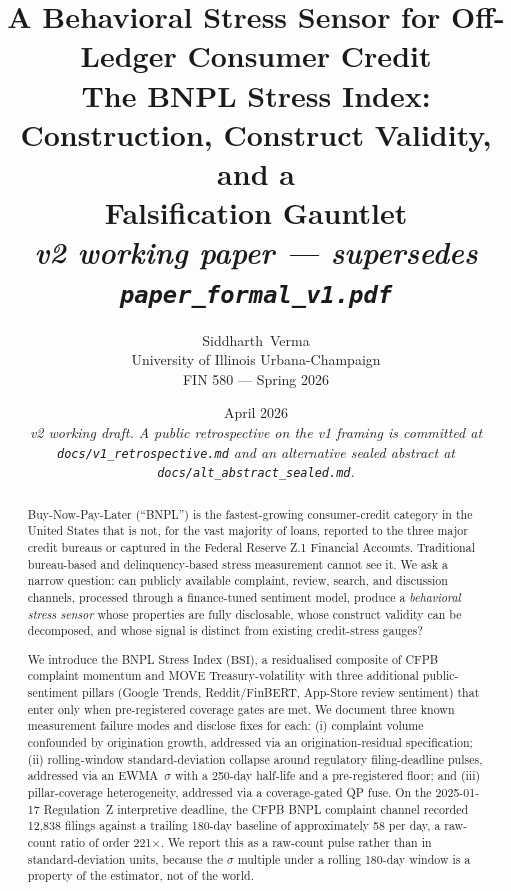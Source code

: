 \documentclass[11pt,letterpaper]{article}
\title{\vspace{-2em}
\Huge\bfseries A Behavioral Stress Sensor for Off-Ledger Consumer Credit\\[0.2em]
\Large The BNPL Stress Index: Construction, Construct Validity, and a\\
Falsification Gauntlet\\[0.3em]
\normalsize\mdseries\itshape v2 working paper --- supersedes \texttt{paper\_formal\_v1.pdf}}
\author{
Siddharth~Verma \\[0.3em]
\small University of Illinois Urbana-Champaign \\
\small FIN 580 --- Spring 2026}
\date{April 2026\\
\small\textit{v2 working draft. A public retrospective on the v1
framing is committed at \texttt{docs/v1\_retrospective.md} and an
alternative sealed abstract at \texttt{docs/alt\_abstract\_sealed.md}.}}
\newcommand{\bsi}{\text{BSI}}
\begin{document}
\maketitle
\thispagestyle{empty}

\begin{abstract}
\noindent
Buy-Now-Pay-Later (``BNPL'') is the fastest-growing consumer-credit
category in the United States that is not, for the vast majority of
loans, reported to the three major credit bureaus or captured in the
Federal Reserve Z.1 Financial Accounts. Traditional bureau-based and
delinquency-based stress measurement cannot see it. We ask a narrow
question: can publicly available complaint, review, search, and
discussion channels, processed through a finance-tuned sentiment
model, produce a \emph{behavioral stress sensor} whose properties are
fully disclosable, whose construct validity can be decomposed, and
whose signal is distinct from existing credit-stress gauges?

We introduce the BNPL Stress Index ($\bsi$), a residualised composite
of CFPB complaint momentum and MOVE Treasury-volatility with three
additional public-sentiment pillars (Google Trends, Reddit/FinBERT,
App-Store review sentiment) that enter only when pre-registered
coverage gates are met. We document three known measurement failure
modes and disclose fixes for each: (i) complaint volume confounded
by origination growth, addressed via an origination-residual
specification; (ii) rolling-window standard-deviation collapse
around regulatory filing-deadline pulses, addressed via an
EWMA~$\sigma$ with a 250-day half-life and a pre-registered floor;
and (iii) pillar-coverage heterogeneity, addressed via a
coverage-gated QP fuse. On the 2025-01-17 Regulation~Z interpretive
deadline, the CFPB BNPL complaint channel recorded 12{,}838 filings
against a trailing 180-day baseline of approximately 58 per day, a
raw-count ratio of order 221$\times$. We report this as a raw-count
pulse rather than in standard-deviation units, because the $\sigma$
multiple under a rolling 180-day window is a property of the
estimator, not of the world.


\end{abstract}
\end{document}
